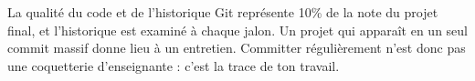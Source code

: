 \documentclass[a4paper,11pt]{article}
\begin{document}
\vspace{6pt}
\begin{tcolorbox}[attention, title={L'historique compte dans la note}]
La qualité du code et de l'historique Git représente 10\% de la note du projet final, et l'historique est examiné à chaque jalon. Un projet qui apparaît en un seul commit massif donne lieu à un entretien. Committer régulièrement n'est donc pas une coquetterie d'enseignante : c'est la trace de ton travail.
\end{tcolorbox}
\end{document}
